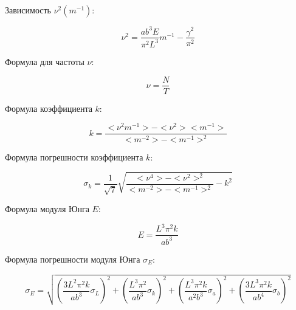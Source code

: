 \documentclass[a4paper,12pt]{article}
\begin{document}
Зависимость $\nu^2\left(m^{-1}\right)$:

$$ \nu^2 = \frac{ab^3E}{\pi^2L^3}m^{-1} - \frac{\gamma^2}{\pi^2} $$

Формула для частоты $\nu$:

$$ \nu = \frac{N}{T}$$

Формула коэффициента $k$:	

$$ k = \frac{<\nu^2m^{-1}> - <\nu^2><m^{-1}>}{<m^{-2}> - <m^{-1}>^2} $$

Формула погрешности коэффициента $k$:

$$ \sigma_k = \frac{1}{\sqrt{7}}\sqrt{\frac{<\nu^4> - <\nu^2>^2}{<m^{-2}> - <m^{-1}>^2} - k^2} $$

Формула модуля Юнга $E$:

$$ E = \frac{L^3\pi^2k}{ab^3} $$

Формула погрешности модуля Юнга $\sigma_E$:

$$ \sigma_E = \sqrt{\left(\frac{3L^2\pi^2k}{ab^3}\sigma_L\right)^2 + \left(\frac{L^3\pi^2}{ab^3}\sigma_k\right)^2 + \left(\frac{L^3\pi^2k}{a^2b^3}\sigma_a\right)^2 + \left(\frac{3L^3\pi^2k}{ab^4}\sigma_b\right)^2} $$
\end{document}
